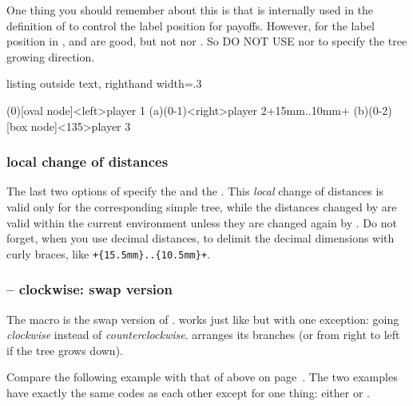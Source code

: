 \remark One thing you should remember about this is that \cmd{\istgrowdirection} is internally used 
in the definition of \cmd{\istb} to control the label position for payoffs.
However, for the label position in \TikZ, \xw{[below]} and \xw{[above]} are good, 
but not \xw{[down]} nor \xw{[up]}.
So DO NOT USE \xw{[down]} nor \xw{[up]} to specify the tree growing direction.

\begin{tcblisting}{listing outside text, righthand width=.3\linewidth}
\begin{istgame}
\xtdistance{20mm}{20mm}
\istroot[right](0)[oval node]<left>{player 1}
  \istb  \istb  \endist
\istroot(a)(0-1)<right>{player 2}+15mm..10mm+
  \istb  \istb  \endist
\istroot[right](b)(0-2)[box node]<135>{player 3}
  \istb  \istb  \endist
\end{istgame}
\end{tcblisting}
\label{page:threesimpletrees}

\subsubsection*{local change of distances}

The last two options of \cmd{\istroot} specify the  and the .
This \emph{local} change of distances is valid only for the corresponding simple tree, while the distances changed by \cmd{\xtdistance} are valid within the current  environment unless they are changed again by \cmd{\xtdistance}.
Do not forget, when you use decimal distances, to delimit the decimal dimensions with curly braces, like
\verb|+{15.5mm}..{10.5mm}+|.

\subsubsection{\protect{} -- clockwise: swap version}

\label{ssec:istroot'}

The macro  is the swap version of \cmd{\istroot}.
 works just like \cmd{\istroot} but with one exception: going \emph{clockwise} instead of \emph{counterclockwise}.
 arranges its branches  (or from right to left if the tree grows down).

Compare the following example with that of \cmd{\istroot} above on page~\pageref{page:clockwise}.
The two examples have exactly the same codes as each other except for one thing: either \cmd{\istroot} or .

